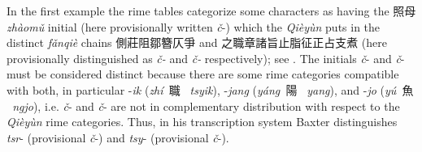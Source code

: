 In the first example the rime tables categorize some characters as
having the 照母 \emph{zhàomǔ} initial (here provisionally written
 \emph{č}-) which the \emph{Qièyùn} puts in the distinct \emph{fǎnqiè}
chains 側莊阻鄒簪仄爭 and 之職章諸旨止脂征正占支煮 (here provisionally
distinguished as \emph{č{}- } and \emph{č{}- } respectively); see . The
initials \emph{č{}}- and \emph{č{}}- must be considered distinct because
there are some rime categories com­patible with both, in particular
-\emph{ik} (\emph{zhí~}職 \emph{~tsyik}), -\emph{jang
}(\emph{yáng~}陽 \emph{~yang}), and -\emph{jo
}(\emph{yú~}魚 \emph{~ngjo}), i.e.  \emph{č{}}- and \emph{č{}}- are not in
com­ple­men­tary distribution with respect to the  \emph{Qièyùn} rime
categories. Thus, in his transcription system Baxter distinguishes
 \emph{tsr}- (pro­vi­sional \emph{č{}}-) and \emph{tsy}- (provisional
 \emph{č{}}-).


